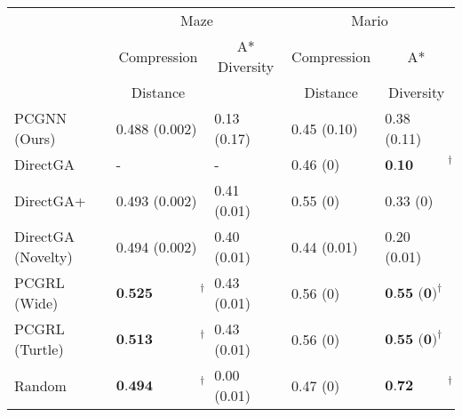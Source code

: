 \begin{tabular}{lllll}
\toprule
{} & \multicolumn{2}{c}{Maze} & \multicolumn{2}{c}{Mario} \\
\multicolumn{1}{c}{} & \multicolumn{1}{c}{Compression} & \multicolumn{1}{c}{A* Diversity} & \multicolumn{1}{c}{Compression} & \multicolumn{1}{c}{A*}\\
{} & \multicolumn{1}{c}{Distance} & \multicolumn{1}{c}{} & \multicolumn{1}{c}{Distance} & \multicolumn{1}{c}{Diversity}\\
\midrule
PCGNN (Ours)       &                       0.488 (0.002) &  0.13 (0.17) &          0.45 (0.10) &                       0.38 (0.11) \\
DirectGA           &                                   - &            - &             0.46 (0) &  $\textbf{0.10 (0.01)}^{\dagger}$ \\
DirectGA+          &                       0.493 (0.002) &  0.41 (0.01) &             0.55 (0) &                          0.33 (0) \\
DirectGA (Novelty) &                       0.494 (0.002) &  0.40 (0.01) &          0.44 (0.01) &                       0.20 (0.01) \\
PCGRL (Wide)       &  $\textbf{0.525 (0.021)}^{\dagger}$ &  0.43 (0.01) &             0.56 (0) &     $\textbf{0.55 (0)}^{\dagger}$ \\
PCGRL (Turtle)     &  $\textbf{0.513 (0.006)}^{\dagger}$ &  0.43 (0.01) &             0.56 (0) &     $\textbf{0.55 (0)}^{\dagger}$ \\
Random             &  $\textbf{0.494 (0.001)}^{\dagger}$ &  0.00 (0.01) &             0.47 (0) &  $\textbf{0.72 (0.02)}^{\dagger}$ \\
\bottomrule
\end{tabular}

